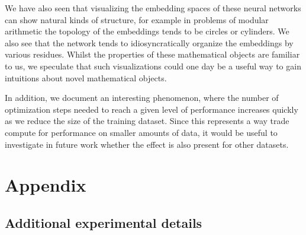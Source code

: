 \documentclass{article} %
\begin{document}
We have also seen that visualizing the embedding spaces of these neural networks can show natural kinds of structure, for example in problems of modular arithmetic the topology of the embeddings tends to be circles or cylinders. We also see that the network tends to idiosyncratically organize the embeddings by various residues. Whilst the properties of these mathematical objects are familiar to us, we speculate that such visualizations could one day be a useful way to gain intuitions about novel mathematical objects.

In addition, we document an interesting phenomenon, where the number of optimization steps needed to reach a given level of performance increases quickly as we reduce the size of the training dataset. Since this represents a way trade compute for performance on smaller amounts of data, it would be useful to investigate in future work whether the effect is also present for other datasets.










\appendix
\section{Appendix}


\subsection{Additional experimental details}
\label{appendix:methods}
\end{document}
